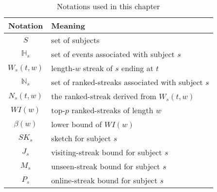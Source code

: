 \begin{table}[h]
\caption{Notations used in this chapter}
\centering
\begin{tabular}{|c|l|}  
\hline 
\textbf{Notation} & \textbf{Meaning} \\ 
\hline
$S$ & set of subjects \\
\hline
$\mathbb{H}_s$ & set of events associated with subject $s$\\
\hline
$W_s(t,w)$ & length-$w$ streak of $s$ ending at $t$\\
\hline
$\mathbb{N}_s$ & set of ranked-streaks associated with subject $s$\\
\hline 
$N_s(t, w)$ & the ranked-streak derived from $W_s(t,w)$ \\ 
\hline 
$WI(w)$ & top-$p$ ranked-streaks of length $w$\\
\hline
$\beta(w)$ & lower bound of $WI(w)$\\
\hline
$SK_s$ & sketch for subject $s$ \\
\hline
$J_s$ & visiting-streak bound for subject $s$ \\
\hline
$M_s$ & unseen-streak bound for subject $s$\\
\hline
$P_s$ & online-streak bound for subject $s$\\
\hline
\end{tabular} 
\label{tbl:notations}
\end{table}
